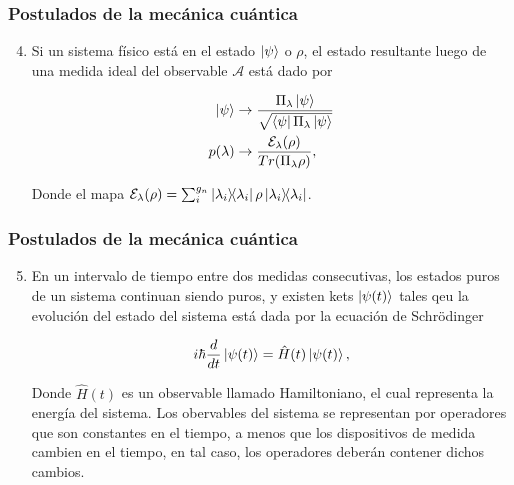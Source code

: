 \documentclass[xetex,mathserif,serif]{beamer}
\begin{document}
\begin{frame}
    \frametitle{Postulados de la mecánica cuántica}

    \begin{enumerate}
        \setcounter{enumi}{3}
        \item Si un sistema físico está en el estado $\ket{\psi}$ o $\rho$, el estado resultante luego de una medida ideal del observable $\mathcal{A}$ está dado por

            \begin{align}
                \ket{\psi} &\rightarrow \frac{\Pi_\lambda \ket{\psi}}{\sqrt{\bra{\psi} \Pi_\lambda \ket{\psi}}} \\
                p(\lambda) &\rightarrow \frac{\mathcal{E}_\lambda(\rho)}{Tr(\Pi_\lambda \rho)} ,
            \end{align}

            Donde el mapa $\mathcal{E}_\lambda(\rho) = \sum_i^{g_n} \ketbra{\lambda_i} \rho \ketbra{\lambda_i}$.
    \end{enumerate}
\end{frame}

\begin{frame}
    \frametitle{Postulados de la mecánica cuántica}

    \begin{enumerate}
        \setcounter{enumi}{4}
        \item En un intervalo de tiempo entre dos medidas consecutivas, los estados puros de un sistema continuan siendo puros, y existen kets $\ket{\psi(t)}$ tales qeu la evolución del estado del sistema está dada por la ecuación de Schrödinger

            \begin{equation}
                i \hbar \frac{d}{dt} \ket{\psi(t)} = \hat{H}(t) \ket{\psi(t)} ,
            \end{equation}

            Donde $\hat{H}(t)$ es un observable llamado Hamiltoniano, el cual representa la energía del sistema. Los obervables del sistema se representan por operadores que son constantes en el tiempo, a menos que los dispositivos de medida cambien en el tiempo, en tal caso, los operadores deberán contener dichos cambios.
    \end{enumerate}
\end{frame}
\end{document}
